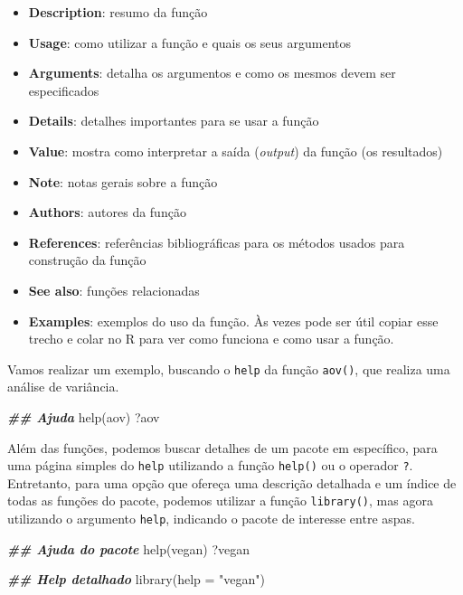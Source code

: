 \documentclass[
]{book}
\newenvironment{Shaded}{\begin{snugshade}}{\end{snugshade}}
\newcommand{\AttributeTok}[1]{\textcolor[rgb]{0.61,0.61,0.61}{#1}}
\newcommand{\DocumentationTok}[1]{\textcolor[rgb]{0.37,0.37,0.37}{\textbf{\textit{#1}}}}
\newcommand{\FunctionTok}[1]{\textcolor[rgb]{0,0,0}{#1}}
\newcommand{\NormalTok}[1]{#1}
\newcommand{\StringTok}[1]{\textcolor[rgb]{0.5,0.5,0.5}{#1}}
\providecommand{\tightlist}{%
  \setlength{\itemsep}{0pt}\setlength{\parskip}{0pt}}
\begin{document}
\begin{itemize}
\tightlist
\item
  \textbf{Description}: resumo da função
\item
  \textbf{Usage}: como utilizar a função e quais os seus argumentos
\item
  \textbf{Arguments}: detalha os argumentos e como os mesmos devem ser especificados
\item
  \textbf{Details}: detalhes importantes para se usar a função
\item
  \textbf{Value}: mostra como interpretar a saída (\emph{output}) da função (os resultados)
\item
  \textbf{Note}: notas gerais sobre a função
\item
  \textbf{Authors}: autores da função
\item
  \textbf{References}: referências bibliográficas para os métodos usados para construção da função
\item
  \textbf{See also}: funções relacionadas
\item
  \textbf{Examples}: exemplos do uso da função. Às vezes pode ser útil copiar esse trecho e colar no R para ver como funciona e como usar a função.
\end{itemize}

Vamos realizar um exemplo, buscando o \texttt{help} da função \texttt{aov()}, que realiza uma análise de variância.

\begin{Shaded}
\begin{Highlighting}[]
\DocumentationTok{\#\# Ajuda}
\FunctionTok{help}\NormalTok{(aov)}
\NormalTok{?aov}
\end{Highlighting}
\end{Shaded}

Além das funções, podemos buscar detalhes de um pacote em específico, para uma página simples do \texttt{help} utilizando a função \texttt{help()} ou o operador \texttt{?}. Entretanto, para uma opção que ofereça uma descrição detalhada e um índice de todas as funções do pacote, podemos utilizar a função \texttt{library()}, mas agora utilizando o argumento \texttt{help}, indicando o pacote de interesse entre aspas.

\begin{Shaded}
\begin{Highlighting}[]
\DocumentationTok{\#\# Ajuda do pacote}
\FunctionTok{help}\NormalTok{(vegan)}
\NormalTok{?vegan}

\DocumentationTok{\#\# Help detalhado}
\FunctionTok{library}\NormalTok{(}\AttributeTok{help =} \StringTok{"vegan"}\NormalTok{)}
\end{Highlighting}
\end{Shaded}
\end{document}
